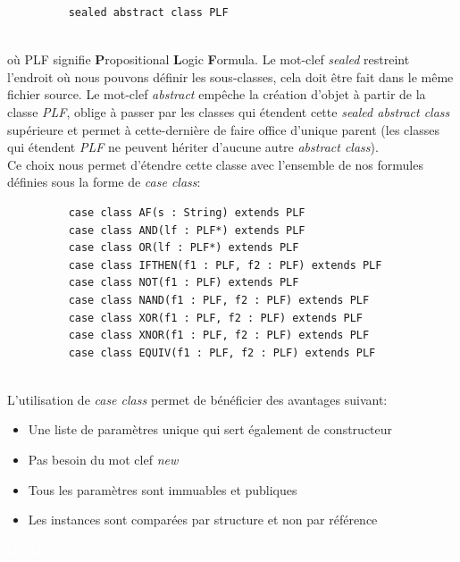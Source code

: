 \documentclass[a4paper, 11pt]{article}
\begin{document}
\begin{figure}[htp]
    \centering
    \begin{verbatim}
    sealed abstract class PLF
  \end{verbatim}
\end{figure}\\

où PLF signifie \textbf{P}ropositional \textbf{L}ogic \textbf{F}ormula. Le mot-clef \textit{sealed} restreint l'endroit où nous pouvons définir les sous-classes, cela doit être fait dans le même fichier source. Le mot-clef \textit{abstract} empêche la création d'objet à partir de la classe \textit{PLF}, oblige à passer par les classes qui étendent cette \textit{sealed abstract class} supérieure et permet à cette-dernière de faire office d'unique parent (les classes qui étendent \textit{PLF} ne peuvent hériter d'aucune autre \textit{abstract class}).\\

Ce choix nous permet d'étendre cette classe avec l'ensemble de nos formules définies sous la forme de \textit{case class}:\\

\begin{figure}[htp]
    \centering
    \begin{verbatim}
    case class AF(s : String) extends PLF 
    case class AND(lf : PLF*) extends PLF
    case class OR(lf : PLF*) extends PLF
    case class IFTHEN(f1 : PLF, f2 : PLF) extends PLF
    case class NOT(f1 : PLF) extends PLF
    case class NAND(f1 : PLF, f2 : PLF) extends PLF
    case class XOR(f1 : PLF, f2 : PLF) extends PLF
    case class XNOR(f1 : PLF, f2 : PLF) extends PLF
    case class EQUIV(f1 : PLF, f2 : PLF) extends PLF
  \end{verbatim}
\end{figure}\\

 L'utilisation de \textit{case class} permet de bénéficier des avantages suivant:
 \begin{itemize}
     \item Une liste de paramètres unique qui sert également de constructeur
     \item Pas besoin du mot clef \textit{new}
     \item Tous les paramètres sont immuables et publiques
     \item Les instances sont comparées par structure et non par référence
 \end{itemize}
\textcolor{white}{blankline}\\
\end{document}

